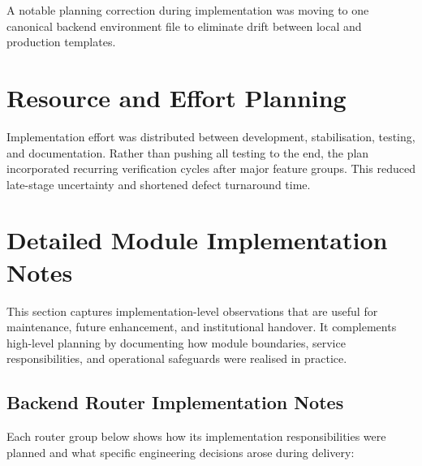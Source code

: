 A notable planning correction during implementation was moving to one canonical backend environment file to eliminate drift between local and production templates.

\section{Resource and Effort Planning}

Implementation effort was distributed between development, stabilisation, testing, and documentation. Rather than pushing all testing to the end, the plan incorporated recurring verification cycles after major feature groups. This reduced late-stage uncertainty and shortened defect turnaround time.

\section{Detailed Module Implementation Notes}

This section captures implementation-level observations that are useful for maintenance, future enhancement, and institutional handover. It complements high-level planning by documenting how module boundaries, service responsibilities, and operational safeguards were realised in practice.

\subsection{Backend Router Implementation Notes}

Each router group below shows how its implementation responsibilities were planned and what specific engineering decisions arose during delivery:


